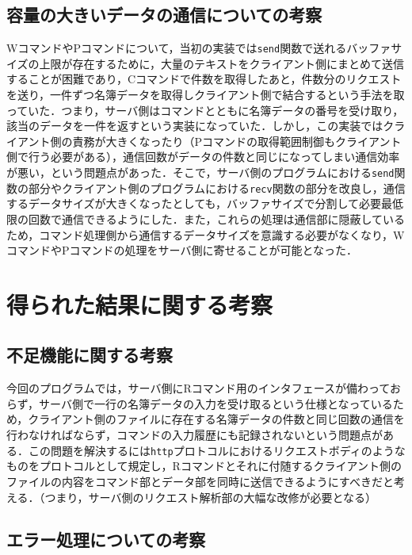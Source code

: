 \documentclass[11pt]{jsarticle}
\begin{document}
\subsection{容量の大きいデータの通信についての考察}

WコマンドやPコマンドについて，当初の実装では{\tt send}関数で送れるバッファサイズの上限が存在するために，大量のテキストをクライアント側にまとめて送信することが困難であり，Cコマンドで件数を取得したあと，件数分のリクエストを送り，一件ずつ名簿データを取得しクライアント側で結合するという手法を取っていた．つまり，サーバ側はコマンドとともに名簿データの番号を受け取り，該当のデータを一件を返すという実装になっていた．しかし，この実装ではクライアント側の責務が大きくなったり（Pコマンドの取得範囲制御もクライアント側で行う必要がある），通信回数がデータの件数と同じになってしまい通信効率が悪い，という問題点があった．そこで，サーバ側のプログラムにおける{\tt send}関数の部分やクライアント側のプログラムにおける{\tt recv}関数の部分を改良し，通信するデータサイズが大きくなったとしても，バッファサイズで分割して必要最低限の回数で通信できるようにした．また，これらの処理は通信部に隠蔽しているため，コマンド処理側から通信するデータサイズを意識する必要がなくなり，WコマンドやPコマンドの処理をサーバ側に寄せることが可能となった．

\section{得られた結果に関する考察}

\subsection{不足機能に関する考察}

今回のプログラムでは，サーバ側にRコマンド用のインタフェースが備わっておらず，サーバ側で一行の名簿データの入力を受け取るという仕様となっているため，クライアント側のファイルに存在する名簿データの件数と同じ回数の通信を行わなければならず，コマンドの入力履歴にも記録されないという問題点がある．この問題を解決するには{\tt http}プロトコルにおけるリクエストボディのようなものをプロトコルとして規定し，Rコマンドとそれに付随するクライアント側のファイルの内容をコマンド部とデータ部を同時に送信できるようにすべきだと考える．（つまり，サーバ側のリクエスト解析部の大幅な改修が必要となる）

\subsection{エラー処理についての考察}
\end{document}
